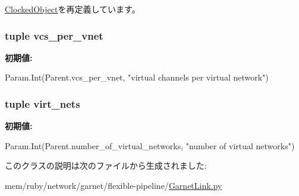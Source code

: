 \hyperlink{classClockedObject_1_1ClockedObject_acce15679d830831b0bbe8ebc2a60b2ca}{ClockedObject}を再定義しています。\hypertarget{classGarnetLink_1_1NetworkLink_a2bb2221cda9b94b6a0c2944d8a12f31e}{
\subsubsection[{vcs\_\-per\_\-vnet}]{\setlength{\rightskip}{0pt plus 5cm}tuple {\bf vcs\_\-per\_\-vnet}}}
\label{classGarnetLink_1_1NetworkLink_a2bb2221cda9b94b6a0c2944d8a12f31e}
{\bfseries 初期値:}
\begin{DoxyCode}
Param.Int(Parent.vcs_per_vnet,
                              "virtual channels per virtual network")
\end{DoxyCode}
\hypertarget{classGarnetLink_1_1NetworkLink_a84c7a415611bc1b55aa5e7fd9e9601e8}{
\subsubsection[{virt\_\-nets}]{\setlength{\rightskip}{0pt plus 5cm}tuple {\bf virt\_\-nets}}}
\label{classGarnetLink_1_1NetworkLink_a84c7a415611bc1b55aa5e7fd9e9601e8}
{\bfseries 初期値:}
\begin{DoxyCode}
Param.Int(Parent.number_of_virtual_networks,
                          "number of virtual networks")
\end{DoxyCode}


このクラスの説明は次のファイルから生成されました:\begin{DoxyCompactItemize}
\item 
mem/ruby/network/garnet/flexible-\/pipeline/\hyperlink{GarnetLink_8py}{GarnetLink.py}\end{DoxyCompactItemize}

